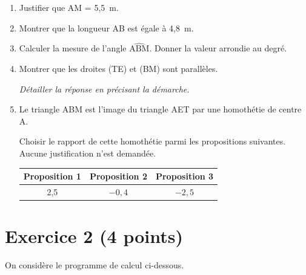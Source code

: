 \documentclass[12pt,a4paper,french]{article}
\begin{document}
\begin{enumerate}
	\item Justifier que AM = 5,5~m.

	\item Montrer que la longueur AB est égale à 4,8~m.

	\item Calculer la mesure de l'angle $\widehat{\text{ABM}}$. Donner la valeur arrondie au degré.

	\item Montrer que les droites (TE) et (BM) sont parallèles.

	\textit{Détailler la réponse en précisant la démarche.}

	\item Le triangle ABM est l'image du triangle AET par une homothétie de centre A.

	Choisir le rapport de cette homothétie parmi les propositions suivantes. Aucune justification n'est demandée.

	\begin{center}
		\begin{tabular}{|c|c|c|}
			\hline
			\textbf{Proposition 1} & \textbf{Proposition 2} & \textbf{Proposition 3} \\
			\hline
			2,5 & $-0,4$ & $-2,5$ \\
			\hline
		\end{tabular}
	\end{center}
\end{enumerate}

\section*{Exercice 2 (4 points)}

On considère le programme de calcul ci-dessous.

\begin{center}
\end{center}
\end{document}

